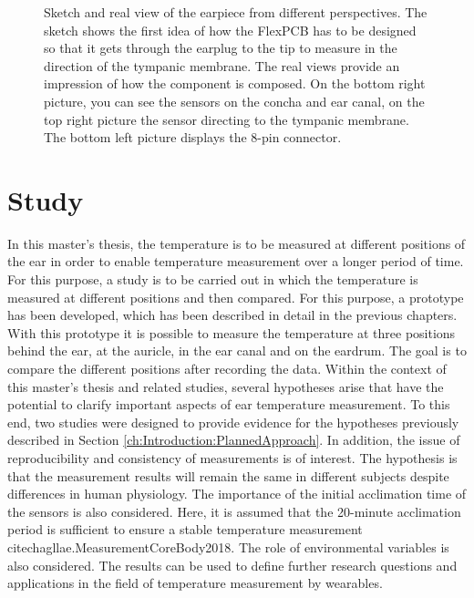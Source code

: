 \begin{figure}[!h]
    \caption{Sketch and real view of the earpiece from different perspectives.
The sketch shows the first idea of how the FlexPCB has to be designed so that it gets through the earplug to the tip to measure in the direction of the tympanic membrane. The real views provide an impression of how the component is composed. On the bottom right picture, you can see the sensors on the concha and ear canal, on the top right picture the sensor directing to the tympanic membrane. The bottom left picture displays the 8-pin connector.}
    \label{fig:design:prototype_earpiece_views}
\end{figure}

\section{Study}
\label{ch:Design:Study}
In this master's thesis, the temperature is to be measured at different positions of the ear in order to enable temperature measurement over a longer period of time. 
For this purpose, a study is to be carried out in which the temperature is measured at different positions and then compared. 
For this purpose, a prototype has been developed, which has been described in detail in the previous chapters. 
With this prototype it is possible to measure the temperature at three positions behind the ear, at the auricle, in the ear canal and on the eardrum.
The goal is to compare the different positions after recording the data. 
Within the context of this master's thesis and related studies, several hypotheses arise that have the potential to clarify important aspects of ear temperature measurement.
To this end, two studies were designed to provide evidence for the hypotheses previously described in Section \ref{ch:Introduction:PlannedApproach}.
In addition, the issue of reproducibility and consistency of measurements is of interest. 
The hypothesis is that the measurement results will remain the same in different subjects despite differences in human physiology. 
The importance of the initial acclimation time of the sensors is also considered. 
Here, it is assumed that the 20-minute acclimation period is sufficient to ensure a stable temperature measurement {cite{chagllae.MeasurementCoreBody2018}}. 
The role of environmental variables is also considered. 
The results can be used to define further research questions and applications in the field of temperature measurement by wearables.


